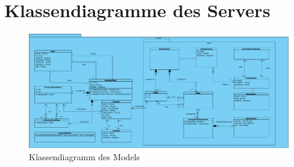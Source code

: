 \makeatletter
\newcommand*{\compress}{\@minipagetrue}
\makeatother

\section*{Klassendiagramme des Servers}

\begin{figure}[h]
	\centering
	\includegraphics[width=\textwidth]{img/Diagramme/Klassen/Model}
	\caption{Klassendiagramm des Models}
	\label{fig:klassendiagramm-model}
\end{figure}


